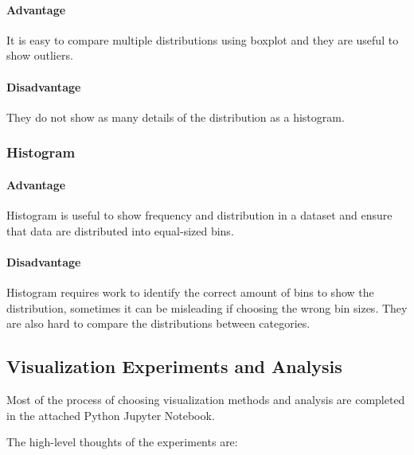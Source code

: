 \documentclass[11pt,twocolumn]{article}
\begin{document}
\paragraph{Advantage} It is easy to compare multiple distributions using boxplot and they are useful to show outliers. 
\paragraph{Disadvantage} They do not show as many details of the distribution as a histogram.

\subsubsection{Histogram} 
\paragraph{Advantage} Histogram is useful to show frequency and distribution in a dataset and ensure that data are distributed into equal-sized bins. 
\paragraph{Disadvantage} Histogram requires work to identify the correct amount of bins to show the distribution, sometimes it can be misleading if choosing the wrong bin sizes. They are also hard to compare the distributions between categories.

\subsection{Visualization Experiments and Analysis }
Most of the process of choosing visualization methods and analysis are completed in the attached Python Jupyter Notebook.

The high-level thoughts of the experiments are:
\end{document}
